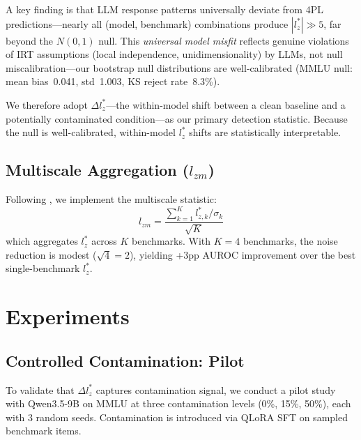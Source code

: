 \documentclass[11pt,a4paper]{article}
\begin{document}
A key finding is that LLM response patterns universally deviate from 4PL predictions---nearly all (model, benchmark) combinations produce $|l_z^*| \gg 5$, far beyond the $N(0,1)$ null. This \emph{universal model misfit} reflects genuine violations of IRT assumptions (local independence, unidimensionality) by LLMs, not null miscalibration---our bootstrap null distributions are well-calibrated (MMLU null: mean bias~0.041, std~1.003, KS reject rate~8.3\%).

We therefore adopt $\Delta l_z^*$---the within-model shift between a clean baseline and a potentially contaminated condition---as our primary detection statistic. Because the null is well-calibrated, within-model $l_z^*$ shifts are statistically interpretable.

\subsection{Multiscale Aggregation ($l_{zm}$)}

Following \citet{hong2021multiscale}, we implement the multiscale statistic:
\begin{equation}
l_{zm} = \frac{\sum_{k=1}^{K} l_{z,k}^* / \sigma_k}{\sqrt{K}}
\end{equation}
which aggregates $l_z^*$ across $K$ benchmarks. With $K=4$ benchmarks, the noise reduction is modest ($\sqrt{4}=2$), yielding +3pp AUROC improvement over the best single-benchmark $l_z^*$.


\section{Experiments}
\label{sec:experiments}

\subsection{Controlled Contamination: Pilot}
\label{sec:pilot}

To validate that $\Delta l_z^*$ captures contamination signal, we conduct a pilot study with Qwen3.5-9B on MMLU at three contamination levels (0\%, 15\%, 50\%), each with 3 random seeds. Contamination is introduced via QLoRA SFT on sampled benchmark items.
\end{document}
